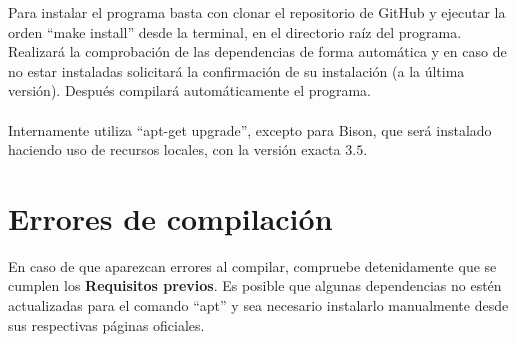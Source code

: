 Para instalar el programa basta con clonar el repositorio de GitHub \cite{Programa} y ejecutar la orden ``make install'' desde la terminal, en el directorio raíz del programa. Realizará la comprobación de las dependencias de forma automática y en caso de no estar instaladas solicitará la confirmación de su instalación (a la última versión). Después compilará automáticamente el programa.\\
\\ Internamente utiliza  ``apt-get upgrade'', excepto para Bison, que será instalado haciendo uso de recursos locales, con la versión exacta $3.5$.

\section{Errores de compilación}

En caso de que aparezcan errores al compilar, compruebe detenidamente que se cumplen los \textbf{Requisitos previos}. Es posible que algunas dependencias no estén actualizadas para el comando ``apt'' y sea necesario instalarlo manualmente desde sus respectivas páginas oficiales.

\endinput

